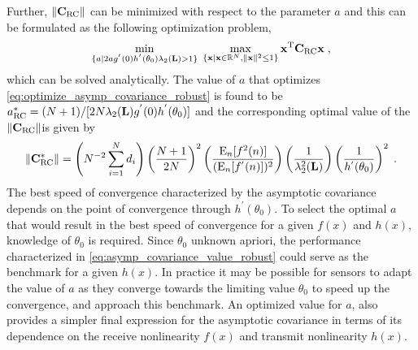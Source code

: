 \documentclass[onecolumn, draft, 12pt]{IEEEtran}
\newcommand{\E}{{\rm E}}
\newcommand{\Rn}{\mathbb{R}^{N}}
\newcommand{\La}{\mathbf{L}}
\newcommand{\Czero}{\mathbf{C}}
\newcommand{\CSR}{\Czero_{\rm RC}}
\newcommand{\x}{\mathbf{x}}
\begin{document}
Further, $ \| \CSR \| $ can be minimized with respect to the parameter $a$ and this can be formulated as the following optimization problem,
\begin{equation} \label{eq:optimize_asymp_covariance_robust}
\min_{\{a | 2 a g^{'}(0) h^{'}(\theta_0) \lambda_{2}(\La) > 1 \} } \; \max_{\{\x | \x \in \Rn,   \| \x \|^2 \leq 1 \} } \x^{\rm T} \CSR \x \;,
\end{equation} which can be solved analytically. The value of $a$ that optimizes \eqref{eq:optimize_asymp_covariance_robust} is found to be $a^{*}_{\rm RC} = (N+1) / [ 2 N \lambda_2(\La) g^{'}(0) h^{'}(\theta_0)]$ and the corresponding optimal value of the $ \| \CSR \| $is given by
\begin{equation} \label{eq:asymp_covariance_value_robust}
 \| \CSR^{*} \| = \left ( N^{-2}  \sum_{i=1}^{N} d_i \right) \left (\frac{N+1}{2 N} \right)^2 \left( \frac{\E_n [f^2(n)]}{(\E_n[f^{'}(n)])^2} \right) \left (\frac{1}{\lambda^2_2(\La)} \right )  \left ( \frac{1}{h^{'}(\theta_0)} \right )^2 \;.
\end{equation}
The best speed of convergence characterized by the asymptotic covariance depends on the point of convergence through $h^{'}(\theta_0)$. To select the optimal $a$ that would result in the best speed of convergence for a given $f(x)$ and $h(x)$, knowledge of $\theta_0$ is required. Since $\theta_0$ unknown apriori, the performance characterized in \eqref{eq:asymp_covariance_value_robust} could serve as the benchmark for a given $h(x)$. In practice it may be possible for sensors to adapt the value of $a$ as they converge towards the limiting value $\theta_0$ to speed up the convergence, and approach this benchmark.  An optimized value for $a$, also provides a simpler final expression for the asymptotic covariance in terms of its dependence on the receive nonlinearity $f(x)$ and transmit nonlinearity $h(x)$.
\end{document}

